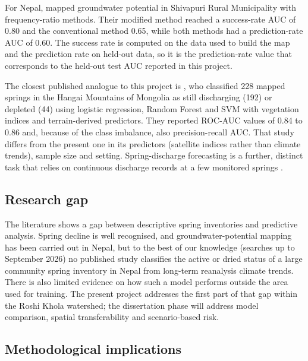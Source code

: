 \documentclass[12pt,a4paper]{article}
\begin{document}
For Nepal, \citet{upadhyaya2024} mapped groundwater potential in Shivapuri Rural Municipality with frequency-ratio methods. Their modified method reached a success-rate AUC of 0.80 and the conventional method 0.65, while both methods had a prediction-rate AUC of 0.60. The success rate is computed on the data used to build the map and the prediction rate on held-out data, so it is the prediction-rate value that corresponds to the held-out test AUC reported in this project.

The closest published analogue to this project is \citet{ishikawa2025}, who classified 228 mapped springs in the Hangai Mountains of Mongolia as still discharging (192) or depleted (44) using logistic regression, Random Forest and SVM with vegetation indices and terrain-derived predictors. They reported ROC-AUC values of 0.84 to 0.86 and, because of the class imbalance, also precision-recall AUC. That study differs from the present one in its predictors (satellite indices rather than climate trends), sample size and setting. Spring-discharge forecasting is a further, distinct task that relies on continuous discharge records at a few monitored springs \citep{granata2018}.

\subsection{Research gap}\label{sec:gap}

The literature shows a gap between descriptive spring inventories and predictive analysis. Spring decline is well recognised, and groundwater-potential mapping has been carried out in Nepal, but to the best of our knowledge (searches up to September 2026) no published study classifies the active or dried status of a large community spring inventory in Nepal from long-term reanalysis climate trends. There is also limited evidence on how such a model performs outside the area used for training. The present project addresses the first part of that gap within the Roshi Khola watershed; the dissertation phase will address model comparison, spatial transferability and scenario-based risk.

\subsection{Methodological implications}\label{sec:lit-methods}
\end{document}
